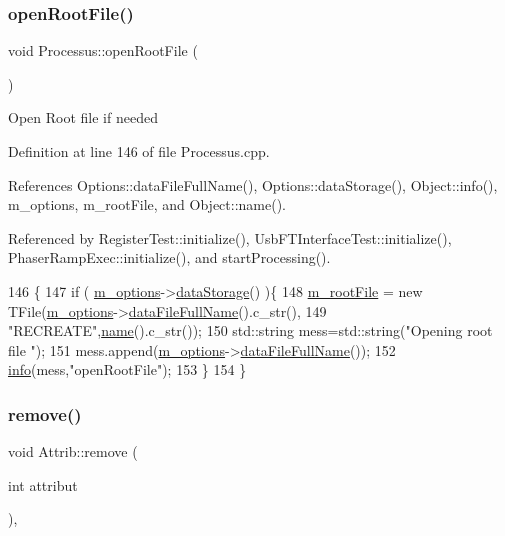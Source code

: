 \subsubsection{\texorpdfstring{open\+Root\+File()}{openRootFile()}}
{\footnotesize\ttfamily void Processus\+::open\+Root\+File (\begin{DoxyParamCaption}{ }\end{DoxyParamCaption})}

Open Root file if needed 

Definition at line 146 of file Processus.\+cpp.



References Options\+::data\+File\+Full\+Name(), Options\+::data\+Storage(), Object\+::info(), m\+\_\+options, m\+\_\+root\+File, and Object\+::name().



Referenced by Register\+Test\+::initialize(), Usb\+F\+T\+Interface\+Test\+::initialize(), Phaser\+Ramp\+Exec\+::initialize(), and start\+Processing().


\begin{DoxyCode}
146                                \{
147   \textcolor{keywordflow}{if} ( \hyperlink{classProcessus_a74205f3c1e00c4448f7b3257c2351797}{m\_options}->\hyperlink{classOptions_aed7799d10139fa542055b982cb820192}{dataStorage}() )\{
148     \hyperlink{classProcessus_a76114f8cf2111e910c323a7ae05a015d}{m\_rootFile} = \textcolor{keyword}{new} TFile(\hyperlink{classProcessus_a74205f3c1e00c4448f7b3257c2351797}{m\_options}->\hyperlink{classOptions_ab1cd9f237e9c18fd72323c74565453f8}{dataFileFullName}().c\_str(),
149                            \textcolor{stringliteral}{"RECREATE"},\hyperlink{classObject_a300f4c05dd468c7bb8b3c968868443c1}{name}().c\_str());
150         std::string mess=std::string(\textcolor{stringliteral}{"Opening root file "});
151         mess.append(\hyperlink{classProcessus_a74205f3c1e00c4448f7b3257c2351797}{m\_options}->\hyperlink{classOptions_ab1cd9f237e9c18fd72323c74565453f8}{dataFileFullName}());
152         \hyperlink{classObject_a644fd329ea4cb85f54fa6846484b84a8}{info}(mess,\textcolor{stringliteral}{"openRootFile"});
153   \}
154 \}
\end{DoxyCode}
\mbox{\label{classAttrib_a7d4ef7e32d93cb287792b87b857e79f3}} 
\subsubsection{\texorpdfstring{remove()}{remove()}}
{\footnotesize\ttfamily void Attrib\+::remove (\begin{DoxyParamCaption}\item[{int}]{attribut }\end{DoxyParamCaption})\hspace{0.3cm}{\ttfamily [inline]}, {\ttfamily [inherited]}}

